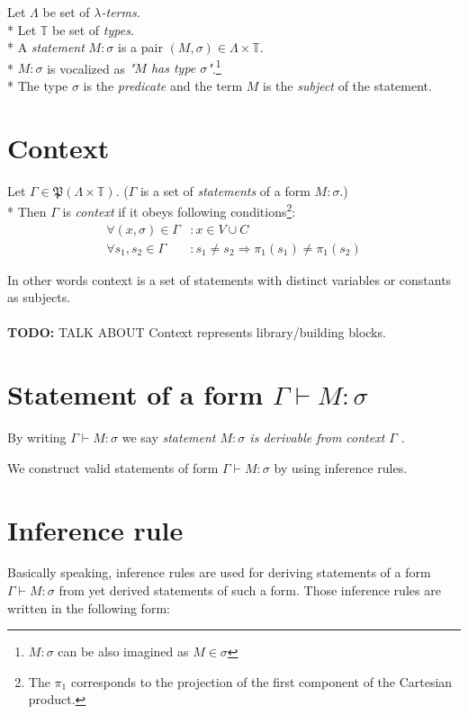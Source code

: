 \documentclass[12pt,a4paper]{report}
\newcommand{\lterms}{$\lambda$-terms\xspace}
\newcommand{\turst}[3]{$#1 \vdash #2 : #3$\xspace}
\newcommand{\GMS}{\turst{\Gamma}{M}{\sigma}}
\begin{document}
	Let $\Lambda$ be set of {\it \lterms}. \\*
	Let $\mathbb{T}$ be set of {\it types}.       \\*
	A {\it statement} $M : \sigma$ is a pair $(M,\sigma) \in \Lambda \times \mathbb{T}$. \\*
	$M : \sigma$ is vocalized as {\it "$M$ has type $\sigma$"}.\footnote{ 
	$M : \sigma$ can be also imagined as $M \in \sigma$ } \\*
	The type $\sigma$ is the {\it predicate} and the term $M$ is the
	{\it subject} of the statement.  
	
\section{Context}

	Let $\Gamma \in \mathfrak P \left({\Lambda \times  \mathbb{T}}\right)$. 
	($\Gamma$ is a set of {\it statements} of a form $M : \sigma$.)	\\*
	Then $\Gamma$ is {\it context} if it obeys following 
	conditions\footnote{
	The $\pi_1$ corresponds to the projection of the first component of the Cartesian product.
	}:
	\begin{align*}
		 \forall (x,\sigma) \in \Gamma &: x \in V \cup C \\
		 \forall s_1,s_2 \in \Gamma &: s_1 \neq s_2 \Rightarrow \pi_1(s_1) \neq \pi_1(s_2)
    \end{align*}
    
	In other words context is a set of statements with distinct variables or constants as subjects.
	\\\\
	\textbf{TODO:} TALK ABOUT Context represents library/building blocks.
	
	
\section{Statement of a form \GMS}

	By writing \GMS we say 
	{\it statement $M : \sigma$ is derivable from context $\Gamma$ }.

	We construct valid statements of form \GMS by using inference rules.
	
		
\section{Inference rule}		
	
	Basically speaking, inference rules are used for deriving statements of a form 
	\GMS from yet derived statements of such a form.
	Those inference rules are written in the following form:
	
\end{document}
